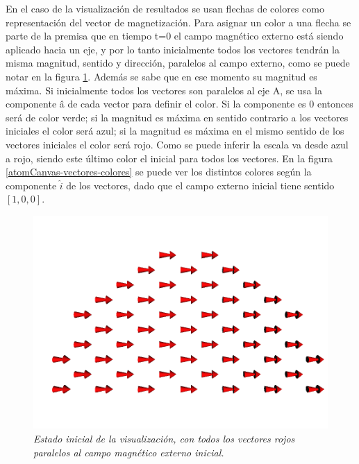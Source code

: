 En el caso de la visualización de resultados se usan flechas de colores como representación del vector de magnetización. Para asignar un color a una flecha se parte de la premisa que en tiempo t=0 el campo magnético externo está siendo aplicado hacia un eje, y por lo tanto inicialmente todos los vectores tendrán la misma magnitud, sentido y dirección, paralelos al campo externo, como se puede notar en la figura \ref{atomCanvas-vectores-inicial}. Además se sabe que en ese momento su magnitud es máxima. Si inicialmente todos los vectores son paralelos al eje A, se usa la componente â de cada vector para definir el color. Si la componente es 0 entonces será de color verde; si la magnitud es máxima en sentido contrario a los vectores iniciales el color será azul; si la magnitud es máxima en el mismo sentido de los vectores iniciales el color será rojo. Como se puede inferir la escala va desde azul a rojo, siendo este último color el inicial para todos los vectores. En la figura \ref{atomCanvas-vectores-colores} se puede ver los distintos colores según la componente $\hat{i}$ de los vectores, dado que el campo externo inicial tiene sentido $[1, 0, 0]$.

\begin{figure}[ht]
  \centering
  \includegraphics[scale=.3]{images/atomCanvas-vectores-inicial}
  \caption{\em Estado inicial de la visualización, con todos los vectores rojos paralelos al campo magnético externo inicial.}
  \label{atomCanvas-vectores-inicial}
\end{figure}

